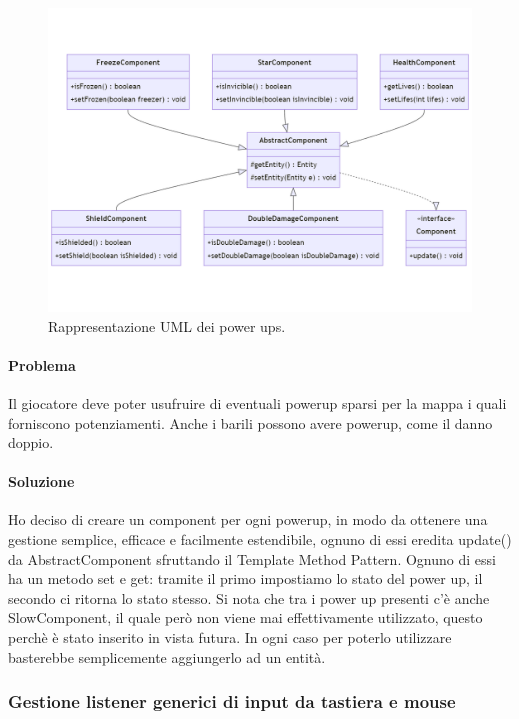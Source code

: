 \documentclass[a4paper,12pt]{report}
\begin{document}
\begin{figure}[H]
\centering{}
\includegraphics[width=\textwidth]{img/somepowerups.jpg}
\caption{Rappresentazione UML dei power ups.}
\end{figure}

\paragraph{Problema} Il giocatore deve poter usufruire di eventuali powerup sparsi per la mappa i quali forniscono potenziamenti. Anche i barili possono avere powerup, come il danno doppio.

\paragraph{Soluzione} Ho deciso di creare un component per ogni powerup, in modo da ottenere una gestione semplice, efficace e facilmente estendibile, ognuno di essi eredita update() da AbstractComponent sfruttando il Template Method Pattern. Ognuno di essi ha un metodo set e get: tramite il primo impostiamo lo stato del power up, il secondo ci ritorna lo stato stesso. Si nota che tra i power up presenti c'è anche SlowComponent, il quale però non viene mai effettivamente utilizzato, questo perchè è stato inserito in vista futura. In ogni caso per poterlo utilizzare basterebbe semplicemente aggiungerlo ad un entità.

\subsubsection{Gestione listener generici di input da tastiera e mouse}
\end{document}

